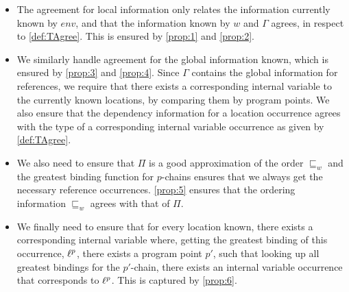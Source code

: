 \documentclass{llncs}
\newcommand{\sqleq}{\ensuremath{\sqsubseteq\xspace}}
\begin{document}

\begin{itemize}
	\item The agreement for local information only relates the information currently known by $env$, and that the information known by $w$ and $\Gamma$ agrees, in respect to \cref{def:TAgree}.
		This is ensured by \eqref{prop:1} and \eqref{prop:2}.

	\item We similarly handle agreement for the global information
          known, which is ensured by \eqref{prop:3} and
          \eqref{prop:4}. 
		Since $\Gamma$ contains the global information for
                references, we require that there exists a
                corresponding internal variable to the currently known
                locations, by comparing them by program points. 
		We also ensure that the dependency information for a location
                occurrence agrees with the type of a corresponding
                internal variable occurrence as given by \cref{def:TAgree}. 

	\item We also need to ensure that $\Pi$ is a good
          approximation of the order $\sqleq_w$ and the greatest
          binding function for $p$-chains ensures that we always get
          the necessary reference occurrences. 
	\eqref{prop:5} ensures that the ordering information
        $\sqleq_w$ agrees with that of $\Pi$.

   \item We finally need to ensure that for every location
        known, there exists a corresponding internal variable
        where, getting the greatest binding of this occurrence,
        $\ell^p$, there exists a program point $p'$, such that
        looking up all greatest bindings for the $p'$-chain, there
        exists an internal variable occurrence that corresponds to
        $\ell^p$. This is captured by \eqref{prop:6}.
\end{itemize}
\end{document}
